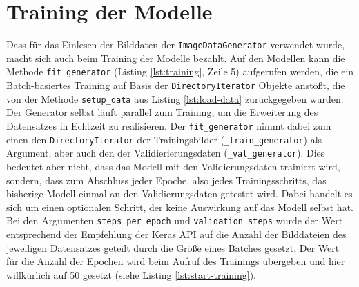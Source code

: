 \section{Training der Modelle}
Dass für das Einlesen der Bilddaten der \texttt{ImageDataGenerator} verwendet wurde, macht sich auch beim Training der Modelle bezahlt.
Auf den Modellen kann die Methode \texttt{fit\_generator} (Listing \ref{lst:training}, Zeile 5) aufgerufen werden, die ein Batch-basiertes Training auf Basis der \texttt{DirectoryIterator} Objekte anstößt, die von der Methode \texttt{setup\_data} aus Listing \ref{lst:load-data} zurückgegeben wurden. Der Generator selbst läuft parallel zum Training, um die Erweiterung des Datensatzes in Echtzeit zu realisieren.
Der \texttt{fit\_generator} nimmt dabei zum einen den \texttt{DirectoryIterator} der Trainingsbilder (\texttt{\_train\_generator}) als Argument, aber auch den der Validierierungsdaten (\texttt{\_val\_generator}). Dies bedeutet aber nicht, dass das Modell mit den Validierungsdaten trainiert wird, sondern, dass zum Abschluss jeder Epoche, also jedes Trainingsschritts, das bisherige Modell einmal an den Validierungsdaten getestet wird. Dabei handelt es sich um einen optionalen Schritt, der keine Auswirkung auf das Modell selbst hat.
Bei den Argumenten \texttt{steps\_per\_epoch} und \texttt{validation\_steps} wurde der Wert entsprechend der Empfehlung der Keras API auf die Anzahl der Bilddateien des jeweiligen Datensatzes geteilt durch die Größe eines Batches gesetzt. Der Wert für die Anzahl der Epochen wird beim Aufruf des Trainings übergeben und hier willkürlich auf 50 gesetzt (siehe Listing \ref{lst:start-training}).

